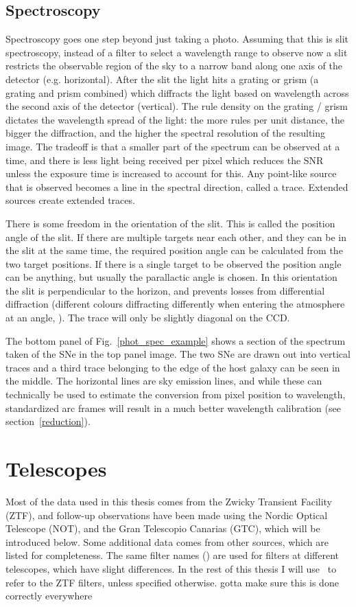 \documentclass[a4paper,oneside,12pt, class=Latex/Classes/PhDthesisPSnPDF, crop=false]{standalone}
\begin{document}
\subsection{Spectroscopy}
Spectroscopy goes one step beyond just taking a photo. Assuming that this is slit spectroscopy, instead of a filter to select a wavelength range to observe now a slit restricts the observable region of the sky to a narrow band along one axis of the detector (e.g. horizontal). After the slit the light hits a grating or grism (a grating and prism combined) which diffracts the light based on wavelength across the second axis of the detector (vertical). The rule density on the grating / grism dictates the wavelength spread of the light: the more rules per unit distance, the bigger the diffraction, and the higher the spectral resolution of the resulting image. The tradeoff is that a smaller part of the spectrum can be observed at a time, and there is less light being received per pixel which reduces the SNR unless the exposure time is increased to account for this. Any point-like source that is observed becomes a line in the spectral direction, called a trace. Extended sources create extended traces.

There is some freedom in the orientation of the slit. This is called the position angle of the slit. If there are multiple targets near each other, and they can be in the slit at the same time, the required position angle can be calculated from the two target positions. If there is a single target to be observed the position angle can be anything, but usually the parallactic angle is chosen. In this orientation the slit is perpendicular to the horizon, and prevents losses from differential diffraction (different colours diffracting differently when entering the atmosphere at an angle, \citealt{diff_refrac_atmosphere}). The trace will only be slightly diagonal on the CCD.

The bottom panel of Fig.~\ref{phot_spec_example} shows a section of the spectrum taken of the SNe in the top panel image. The two SNe are drawn out into vertical traces and a third trace belonging to the edge of the host galaxy can be seen in the middle. The horizontal lines are sky emission lines, and while these can technically be used to estimate the conversion from pixel position to wavelength, standardized arc frames will result in a much better wavelength calibration (see section~\ref{reduction}).


\section{Telescopes}
\label{telescopes}
Most of the data used in this thesis comes from the Zwicky Transient Facility (ZTF), and follow-up observations have been made using the Nordic Optical Telescope (NOT), and the Gran Telescopio Canarias (GTC), which will be introduced below. Some additional data comes from other sources, which are listed for completeness. The same filter names (\ztfg\ztfr\ztfi) are used for filters at different telescopes,  which have slight differences. In the rest of this thesis I will use \ztfg\ztfr\ztfi\ to refer to the ZTF filters, unless specified otherwise. \color{red} gotta make sure this is done correctly everywhere \color{black}
\end{document}
